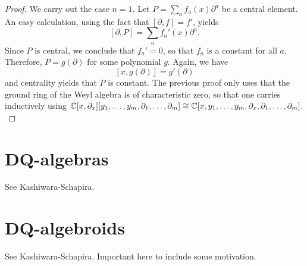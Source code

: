 \begin{proof}
	We carry out the case $n=1$. Let $P = \sum_{a}f_{a}(x)\partial^{a}$ be a central element. An easy calculation, using the fact that $[\partial, f] = f'$, yields
	\[
		[\partial, P] = \sum_{a}f_{a}'(x)\partial^{a}.
	\]
	Since $P$ is central, we conclude that $f_{a}' = 0$, so that $f_{a}$ is a constant for all $a$. Therefore, $P = g(\partial)$ for some polynomial $g$. Again, we have
	\[
		[x, g(\partial)] = g'(\partial)
	\]
	and centrality yields that $P$ is constant. The previous proof only uses that the ground ring of the Weyl algebra is of characteristic zero, so that one carries inductively using ${\mathbb C}[x, \partial_{x}][y_{1}, \ldots, y_{m}, \partial_{1}, \ldots, \partial_{m}] \cong {\mathbb C}[x, y_{1}, \ldots, y_{m}, \partial_{x}, \partial_{1}, \ldots, \partial_{m}].$
\end{proof}

\section{DQ-algebras}
See Kashiwara-Schapira.
\section{DQ-algebroids}
See Kashiwara-Schapira. Important here to include some motivation. 